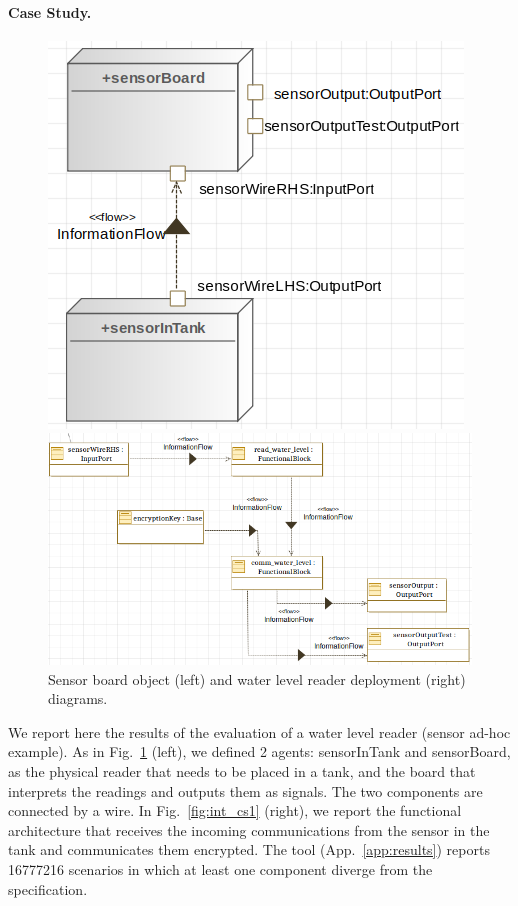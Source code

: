 \documentclass[runningheads]{llncs}
\begin{document}
\paragraph{Case Study.}
\begin{figure}[t]
\begin{minipage}[t]{0.3\textwidth}
\includegraphics[width=\columnwidth]{eng_cs1.png}
\end{minipage}
\begin{minipage}[t]{0.7\textwidth}
\includegraphics[width=\columnwidth]{internal_cs1.png}
\end{minipage}
  \caption{Sensor board object (left) and water level reader deployment (right) diagrams.}
\label{fig:int_cs1}
\label{fig:eng_cs1}
\end{figure}
We report here the results of the evaluation of a water level reader (sensor ad-hoc example). 
As in Fig.~\ref{fig:eng_cs1} (left), we defined 2 agents: sensorInTank and sensorBoard,
as the physical reader that needs to be placed in a tank, and 
the board that interprets the readings and outputs them as signals.
The two components are connected by a wire.
In Fig.~\ref{fig:int_cs1} (right), we report the functional architecture that
receives the incoming communications from the sensor in the tank and 
communicates them encrypted.
The tool (App.~\ref{app:results}) reports 16777216
scenarios in which at least one component diverge from the specification.
\end{document}
